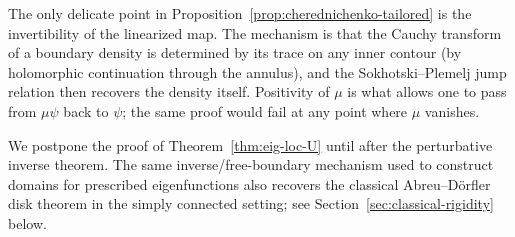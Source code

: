 \begin{remark}
The only delicate point in
Proposition~\ref{prop:cherednichenko-tailored} is the invertibility of the
linearized map. The mechanism is that the Cauchy transform of a boundary
density is determined by its trace on any inner contour (by holomorphic
continuation through the annulus), and the Sokhotski--Plemelj jump relation
then recovers the density itself. Positivity of \(\mu\) is what allows one
to pass from \(\mu\psi\) back to \(\psi\); the same proof would fail at any
point where \(\mu\) vanishes.
\end{remark}

\medskip

We postpone the proof of Theorem~\ref{thm:eig-loc-U} until after the
perturbative inverse theorem. The same inverse/free-boundary mechanism used
to construct domains for prescribed eigenfunctions also recovers the
classical Abreu--D\"orfler disk theorem in the simply connected setting; see
Section~\ref{sec:classical-rigidity} below.

